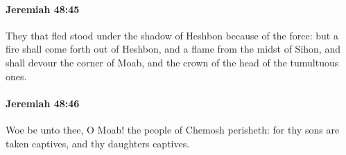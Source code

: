 		\paragraph{Jeremiah 48:45} %
			\label{JEREMIAH-48-45}

			They that fled stood under the shadow of Heshbon because of the force: but a fire shall come forth out of Heshbon, and a flame from the midst of Sihon, and shall devour the corner of Moab, and the crown of the head of the tumultuous ones.


		\paragraph{Jeremiah 48:46} %
			\label{JEREMIAH-48-46}

			Woe be unto thee, O Moab! the people of Chemosh perisheth: for thy sons are taken captives, and thy daughters captives.


